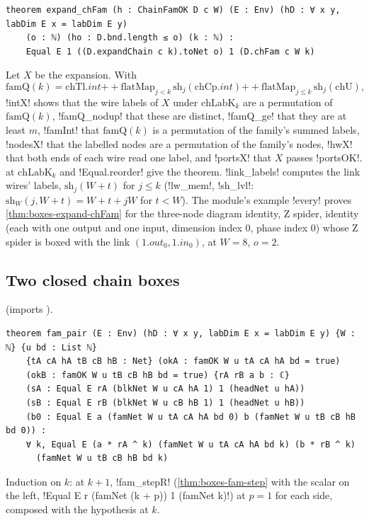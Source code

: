 {\begin{theorem}\label{thm:boxes-expand-chFam}
\begin{lstlisting}[style=leanbox]
theorem expand_chFam (h : ChainFamOK D c W) (E : Env) (hD : ∀ x y, labDim E x = labDim E y)
    (o : ℕ) (ho : D.bnd.length ≤ o) (k : ℕ) :
    Equal E 1 ((D.expandChain c k).toNet o) 1 (D.chFam c W k)
\end{lstlisting}
\end{theorem}
\noindent Let $X$ be the expansion. With
\[
\mathrm{famQ}(k)=\mathrm{chTl}.\mathit{int}\mathbin{+\!\!+}\mathrm{flatMap}_{j<k}\,\mathrm{sh}_j(\mathrm{chCp}.\mathit{int})\mathbin{+\!\!+}\mathrm{flatMap}_{j\le k}\,\mathrm{sh}_j(\mathrm{chU}),
\]
\lbx!intX! shows that the wire labels of $X$ under $\mathrm{chLabK}_k$ are a permutation of $\mathrm{famQ}(k)$, \lbx!famQ_nodup! that these are distinct, \lbx!famQ_ge! that they are at least $m$, \lbx!famInt! that $\mathrm{famQ}(k)$ is a permutation of the family's summed labels, \lbx!nodesX! that the labelled nodes are a permutation of the family's nodes, \lbx!hwX! that both ends of each wire read one label, and \lbx!portsX! that $X$ passes \lbx!portsOK!.  at $\mathrm{chLabK}_k$ and \lbx!Equal.reorder! give the theorem. \lbx!link_labels! computes the link wires' labels, $\mathrm{sh}_j(W+t)$ for $j\le k$ (\lbx!lw_mem!, \lbx!sh_lvl!: $\mathrm{sh}_W(j,W+t)=W+t+jW$ for $t<W$). The module's example \lbx!every! proves \cref{thm:boxes-expand-chFam} for the three-node diagram identity, Z spider, identity (each with one output and one input, dimension index $0$, phase index $0$) whose Z spider is boxed with the link $(1.\mathit{out}_0,1.\mathit{in}_0)$, at $W=8$, $o=2$.

\subsection{Two closed chain boxes}

 (imports ).

\begin{theorem}\label{thm:boxes-fam-pair}
\begin{lstlisting}[style=leanbox]
theorem fam_pair (E : Env) (hD : ∀ x y, labDim E x = labDim E y) {W : ℕ} {u bd : List ℕ}
    {tA cA hA tB cB hB : Net} (okA : famOK W u tA cA hA bd = true)
    (okB : famOK W u tB cB hB bd = true) {rA rB a b : ℂ}
    (sA : Equal E rA (blkNet W u cA hA 1) 1 (headNet u hA))
    (sB : Equal E rB (blkNet W u cB hB 1) 1 (headNet u hB))
    (b0 : Equal E a (famNet W u tA cA hA bd 0) b (famNet W u tB cB hB bd 0)) :
    ∀ k, Equal E (a * rA ^ k) (famNet W u tA cA hA bd k) (b * rB ^ k)
      (famNet W u tB cB hB bd k)
\end{lstlisting}
\end{theorem}
\noindent Induction on $k$: at $k+1$, \lbx!fam_stepR! (\cref{thm:boxes-fam-step} with the scalar on the left, \lbx!Equal E r (famNet (k + p)) 1 (famNet k)!) at $p=1$ for each side, composed with the hypothesis at $k$.

}
